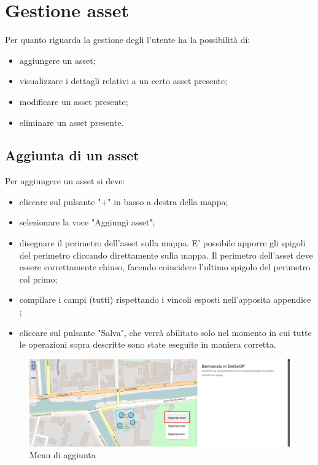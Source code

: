 \section{Gestione asset}
	Per quanto riguarda la gestione degli  l'utente ha la possibilità di:
	\begin{itemize}
		\item aggiungere un asset;
		\item visualizzare i dettagli relativi a un certo asset presente;
		\item modificare un asset presente;
		\item eliminare un asset presente.
	\end{itemize}

\subsection{Aggiunta di un asset}
	Per aggiungere un asset si deve:
	\begin{itemize}
		\item cliccare sul pulsante "+" in basso a destra della mappa;
		\item selezionare la voce "Aggiungi asset";
		\item disegnare il perimetro dell'asset sulla mappa. E' possibile apporre gli spigoli del perimetro cliccando direttamente sulla mappa. Il perimetro dell'asset deve essere correttamente chiuso, facendo coincidere l'ultimo spigolo del perimetro col primo;
		\item compilare i campi (tutti) rispettando i vincoli esposti nell'apposita appendice ;
		\item cliccare sul pulsante "Salva", che verrà abilitato solo nel momento in cui tutte le operazioni sopra descritte sono state eseguite in maniera corretta.
	\end{itemize}
	
	\begin{figure}[H]
	\centering
	\includegraphics[width=\textwidth]{img/menu_aperto_asset_hover.png}
	\caption{Menu di aggiunta}
	\end{figure}
	
